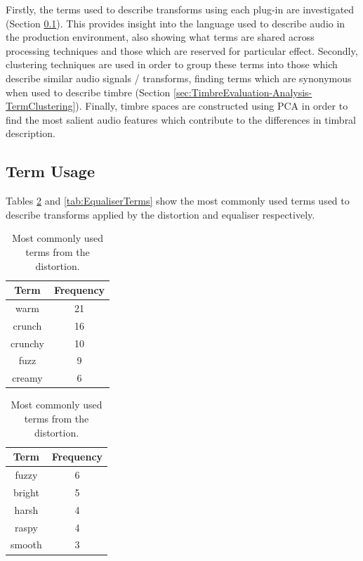 	Firstly, the terms used to describe transforms using each plug-in are investigated (Section
	\ref{sec:TimbreEvaluation-Analysis-TermUsage}). This provides insight into the language used to describe audio in
	the production environment, also showing what terms are shared across processing techniques and those which are
	reserved for particular effect. Secondly, clustering techniques are used in order to group these terms into those
	which describe similar audio signals / transforms, finding terms which are synonymous when used to describe
	timbre (Section \ref{sec:TimbreEvaluation-Analysis-TermClustering}). Finally, timbre spaces are constructed using
	PCA in order to find the most salient audio features which contribute to the differences in timbral description.

	\subsection{Term Usage}
	\label{sec:TimbreEvaluation-Analysis-TermUsage}
		Tables \ref{tab:DistortionTerms} and \ref{tab:EqualiserTerms} show the most commonly used terms used to
		describe transforms applied by the distortion and equaliser respectively.

		\begin{table}[h!]
			\centering
			\begin{tabular}{|c|c|}
				\hline
				\bf{Term} & \bf{Frequency} \tabularnewline
				\hline
				\hline
				warm & 21 \tabularnewline
				\hline
				crunch & 16 \tabularnewline
				\hline
				crunchy & 10 \tabularnewline
				\hline
				fuzz & 9 \tabularnewline
				\hline
				creamy & 6 \tabularnewline
				\hline
			\end{tabular}
			\qquad
			\begin{tabular}{|c|c|}
				\hline
				\bf{Term} & \bf{Frequency} \tabularnewline
				\hline
				\hline
				fuzzy & 6 \tabularnewline
				\hline
				bright & 5 \tabularnewline
				\hline
				harsh & 4 \tabularnewline
				\hline
				raspy & 4 \tabularnewline
				\hline
				smooth & 3 \tabularnewline
				\hline
			\end{tabular}
			\caption{Most commonly used terms from the distortion.}
			\label{tab:DistortionTerms}
		\end{table}

